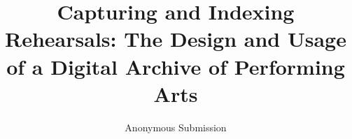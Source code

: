 \documentclass[conference]{IEEEtran}
\begin{document}
%
\title{Capturing and Indexing Rehearsals: The Design and Usage of a Digital Archive of Performing Arts}


% 
\author{Anonymous Submission}





\maketitle
\end{document}
